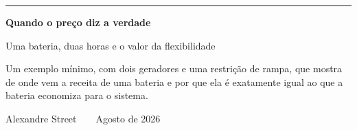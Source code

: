 {
\begin{frame}[plain]
  \vspace{1.7em}
  {\color{brick}\rule{3.6em}{2.4pt}}

  \vspace{1.1em}
  {\fontsize{29}{33}\selectfont\bfseries Quando o preço diz a verdade\par}

  \vspace{0.55em}
  {\fontsize{14.5}{18}\selectfont\color{muted} Uma bateria, duas horas e o valor da flexibilidade\par}

  \vspace{1.5em}
  \begin{minipage}{0.70\textwidth}
    \fontsize{9.6}{13}\selectfont
    Um exemplo mínimo, com dois geradores e uma restrição de rampa, que mostra de
    onde vem a receita de uma bateria e por que ela é exatamente igual ao que a
    bateria economiza para o sistema.
  \end{minipage}

  \vfill
  {\fontsize{8.4}{10}\selectfont\color{muted} Alexandre Street\ \ \textbullet\ \ Agosto de 2026}
  \vspace{0.8em}
\end{frame}}

